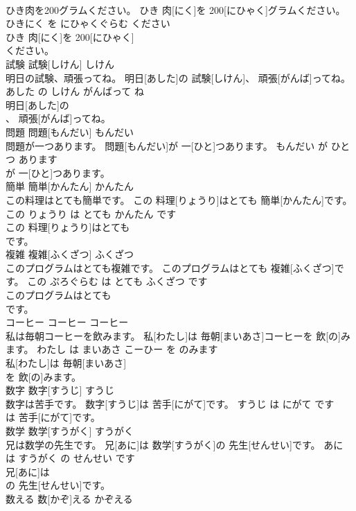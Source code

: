 \documentclass[8pt]{extreport}
\begin{document}
\begin{CJK}{UTF8}{min}
\\	ひき肉を200グラムください。	ひき 肉[にく]を 200[にひゃく]グラムください。	ひきにく を にひゃくぐらむ ください	
\\	ひき 肉[にく]を 200[にひゃく]
\\	ください。		
\\	試験	試験[しけん]	しけん	
\\	明日の試験、頑張ってね。	明日[あした]の 試験[しけん]、 頑張[がんば]ってね。	あした の しけん がんばって ね	
\\	明日[あした]の
\\	、 頑張[がんば]ってね。		
\\	問題	問題[もんだい]	もんだい	
\\	問題が一つあります。	問題[もんだい]が 一[ひと]つあります。	もんだい が ひとつ あります	
\\	が 一[ひと]つあります。		
\\	簡単	簡単[かんたん]	かんたん	
\\	この料理はとても簡単です。	この 料理[りょうり]はとても 簡単[かんたん]です。	この りょうり は とても かんたん です	
\\	この 料理[りょうり]はとても
\\	です。		
\\	複雑	複雑[ふくざつ]	ふくざつ	
\\	このプログラムはとても複雑です。	このプログラムはとても 複雑[ふくざつ]です。	この ぷろぐらむ は とても ふくざつ です	
\\	このプログラムはとても
\\	です。		
\\	コーヒー	コーヒー	コーヒー	
\\	私は毎朝コーヒーを飲みます。	私[わたし]は 毎朝[まいあさ]コーヒーを 飲[の]みます。	わたし は まいあさ こーひー を のみます	
\\	私[わたし]は 毎朝[まいあさ]
\\	を 飲[の]みます。		
\\	数字	数字[すうじ]	すうじ	
\\	数字は苦手です。	数字[すうじ]は 苦手[にがて]です。	すうじ は にがて です	
\\	は 苦手[にがて]です。		
\\	数学	数学[すうがく]	すうがく	
\\	兄は数学の先生です。	兄[あに]は 数学[すうがく]の 先生[せんせい]です。	あに は すうがく の せんせい です	
\\	兄[あに]は
\\	の 先生[せんせい]です。		
\\	数える	数[かぞ]える	かぞえる	

\end{CJK}
\end{document}
